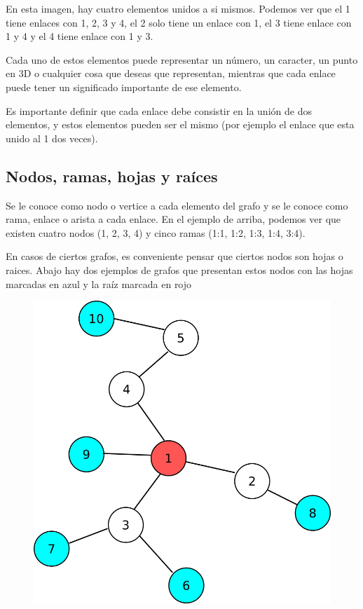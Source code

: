 \documentclass{article}
\begin{document}
En esta imagen, hay cuatro elementos unidos a si mismos. Podemos ver que el 1 tiene enlaces con 1, 2, 3 y 4, el 2 solo tiene un enlace con 1, el 3 tiene enlace con 1 y 4 y el 4 tiene enlace con 1 y 3.

Cada uno de estos elementos puede representar un número, un caracter, un punto en 3D o cualquier cosa que deseas que representan, mientras que cada enlace puede tener un significado importante de ese elemento.

Es importante definir que cada enlace debe consistir en la unión de dos elementos, y estos elementos pueden ser el mismo (por ejemplo el enlace que esta unido al 1 dos veces).

\subsection{Nodos, ramas, hojas y raíces}

Se le conoce como nodo o vertice a cada elemento del grafo y se le conoce como rama, enlace o arista a cada enlace. En el ejemplo de arriba, podemos ver que existen cuatro nodos (1, 2, 3, 4) y cinco ramas (1:1, 1:2, 1:3, 1:4, 3:4).

En casos de ciertos grafos, es conveniente pensar que ciertos nodos son hojas o raices. Abajo hay dos ejemplos de grafos que presentan estos nodos con las hojas marcadas en azul y la raíz marcada en rojo

\begin{figure}[H]
    \centering
    \includegraphics[width=0.25\paperwidth]{expansivo}
\end{figure}
\end{document}
